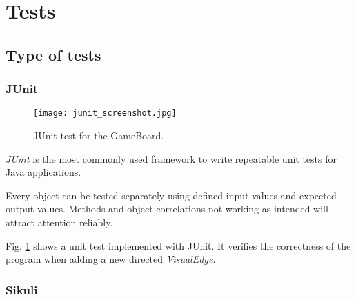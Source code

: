 \section{Tests}
\label{section:tests}

\subsection{Type of tests}

\subsubsection{JUnit}

\begin{figure}[h]
	\centering
	\texttt{[image: junit\_screenshot.jpg]}
	\caption{JUnit test for the GameBoard.}
	\label{img:screenJUnit}
\end{figure}
\emph{JUnit} is the most commonly used framework to write repeatable unit tests for Java applications.\par
Every object can be tested separately using defined input values and expected output values. Methods and object correlations not working as intended will attract attention reliably.\par
Fig. \ref{img:screenJUnit} shows a unit test implemented with JUnit. It verifies the correctness of the program when adding a new directed \emph{VisualEdge}.

\subsubsection{Sikuli}

